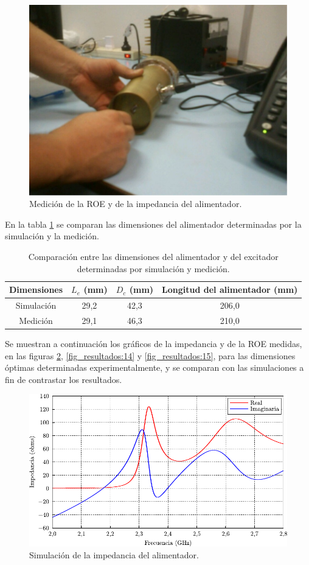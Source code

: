 \begin{figure}[H]
\centering
\includegraphics[scale = 0.4]{Figures/Resultados/resultados_12}
\caption{Medición de la ROE y de la impedancia del alimentador.}
\label{fig_resultados:12}
\end{figure}
En la tabla \ref{tabla_mediciones:1} se comparan las dimensiones del alimentador determinadas por la simulación y la medición.
\begin{table}[H]
\centering
\begin{tabular}{|c|c|c|c|}
\hline
Dimensiones & $L_e$ (mm) & $D_c$ (mm) & Longitud del alimentador (mm)\\
\hline
Simulación & 29,2 & 42,3 & 206,0\\
\hline
Medición & 29,1 & 46,3 & 210,0\\
\hline
\end{tabular}
\caption{Comparación entre las dimensiones del alimentador y del excitador determinadas por simulación y medición.}
\label{tabla_mediciones:1}
\end{table}
Se muestran a continuación los gráficos de la impedancia y de la ROE medidas, en las figuras \ref{fig_resultados:13}, \ref{fig_resultados:14} y \ref{fig_resultados:15}, para las dimensiones óptimas determinadas experimentalmente, y se comparan con las simulaciones a fin de contrastar los resultados.
\begin{figure}[H]
\centering
\includegraphics[scale = 1]{Figures/Resultados/resultados_13}
\caption{Simulación de la impedancia del alimentador.}
\label{fig_resultados:13}
\end{figure}
